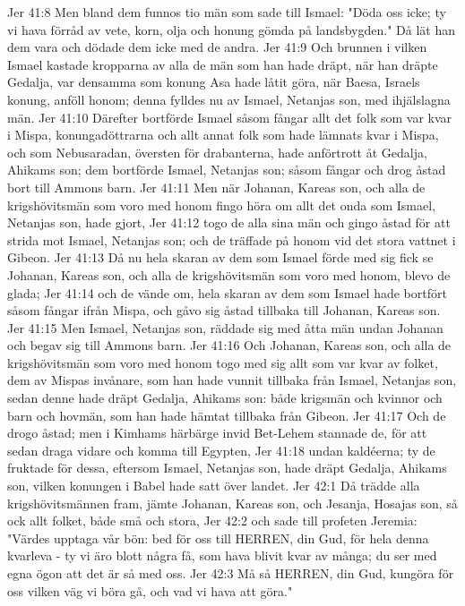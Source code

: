 Jer 41:8  Men bland dem funnos tio män som sade till Ismael: "Döda oss icke; ty vi hava förråd av vete, korn, olja och honung gömda på landsbygden." Då lät han dem vara och dödade dem icke med de andra.
Jer 41:9  Och brunnen i vilken Ismael kastade kropparna av alla de män som han hade dräpt, när han dräpte Gedalja, var densamma som konung Asa hade låtit göra, när Baesa, Israels konung, anföll honom; denna fylldes nu av Ismael, Netanjas son, med ihjälslagna män.
Jer 41:10  Därefter bortförde Ismael såsom fångar allt det folk som var kvar i Mispa, konungadöttrarna och allt annat folk som hade lämnats kvar i Mispa, och som Nebusaradan, översten för drabanterna, hade anförtrott åt Gedalja, Ahikams son; dem bortförde Ismael, Netanjas son; såsom fångar och drog åstad bort till Ammons barn.
Jer 41:11  Men när Johanan, Kareas son, och alla de krigshövitsmän som voro med honom fingo höra om allt det onda som Ismael, Netanjas son, hade gjort,
Jer 41:12  togo de alla sina män och gingo åstad för att strida mot Ismael, Netanjas son; och de träffade på honom vid det stora vattnet i Gibeon.
Jer 41:13  Då nu hela skaran av dem som Ismael förde med sig fick se Johanan, Kareas son, och alla de krigshövitsmän som voro med honom, blevo de glada;
Jer 41:14  och de vände om, hela skaran av dem som Ismael hade bortfört såsom fångar ifrån Mispa, och gåvo sig åstad tillbaka till Johanan, Kareas son.
Jer 41:15  Men Ismael, Netanjas son, räddade sig med åtta män undan Johanan och begav sig till Ammons barn.
Jer 41:16  Och Johanan, Kareas son, och alla de krigshövitsmän som voro med honom togo med sig allt som var kvar av folket, dem av Mispas invånare, som han hade vunnit tillbaka från Ismael, Netanjas son, sedan denne hade dräpt Gedalja, Ahikams son: både krigsmän och kvinnor och barn och hovmän, som han hade hämtat tillbaka från Gibeon.
Jer 41:17  Och de drogo åstad; men i Kimhams härbärge invid Bet-Lehem stannade de, för att sedan draga vidare och komma till Egypten,
Jer 41:18  undan kaldéerna; ty de fruktade för dessa, eftersom Ismael, Netanjas son, hade dräpt Gedalja, Ahikams son, vilken konungen i Babel hade satt över landet.
Jer 42:1  Då trädde alla krigshövitsmännen fram, jämte Johanan, Kareas son, och Jesanja, Hosajas son, så ock allt folket, både små och stora,
Jer 42:2  och sade till profeten Jeremia: "Värdes upptaga vår bön: bed för oss till HERREN, din Gud, för hela denna kvarleva - ty vi äro blott några få, som hava blivit kvar av många; du ser med egna ögon att det är så med oss.
Jer 42:3  Må så HERREN, din Gud, kungöra för oss vilken väg vi böra gå, och vad vi hava att göra."
